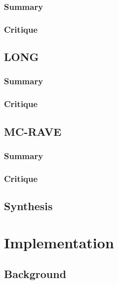 \documentclass[letterpaper]{article}
\begin{document}
\subsubsection{Summary}

\subsubsection{Critique}

\subsection{LONG}

\subsubsection{Summary}

\subsubsection{Critique}

\subsection{MC-RAVE}

\subsubsection{Summary}

\subsubsection{Critique}

\subsection{Synthesis}

\section{Implementation}

\subsection{Background}
\end{document}
